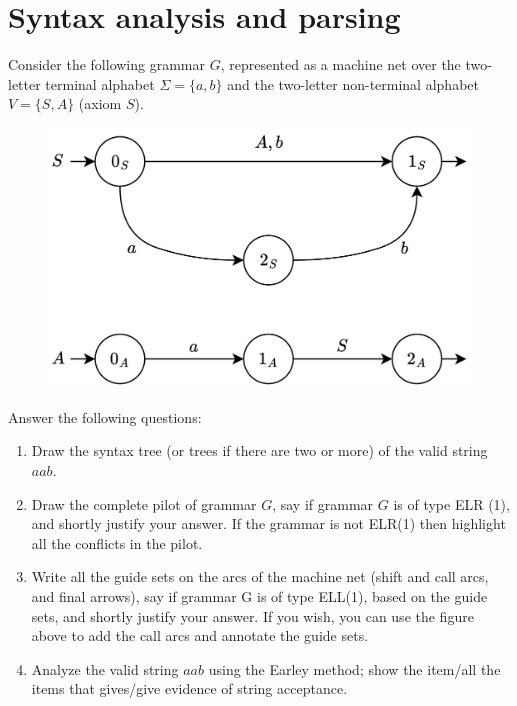 \section{Syntax analysis and parsing}

Consider the following grammar $G$, represented as a machine net over the two-letter terminal alphabet $\Sigma = \{ a, b \}$ and the two-letter non-terminal alphabet 
$V = \{ S, A \}$ (axiom $S$).
\begin{figure}[H]
    \centering
    \includegraphics[width=0.5\linewidth]{images/parsing.png}
\end{figure} 
Answer the following questions:
\begin{enumerate}
    \item Draw the syntax tree (or trees if there are two or more) of the valid string $a a b$.
    \item Draw the complete pilot of grammar $G$, say if grammar $G$ is of type ELR (1), and shortly justify your answer. 
        If the grammar is not ELR(1) then highlight all the conflicts in the pilot.
    \item Write all the guide sets on the arcs of the machine net (shift and call arcs, and final arrows), say if grammar G is of type ELL(1), based on the guide sets, and shortly justify your answer. 
        If you wish, you can use the figure above to add the call arcs and annotate the guide sets.
    \item Analyze the valid string $a a b$ using the Earley method; show the item/all the items that gives/give evidence of string acceptance.
\end{enumerate}

